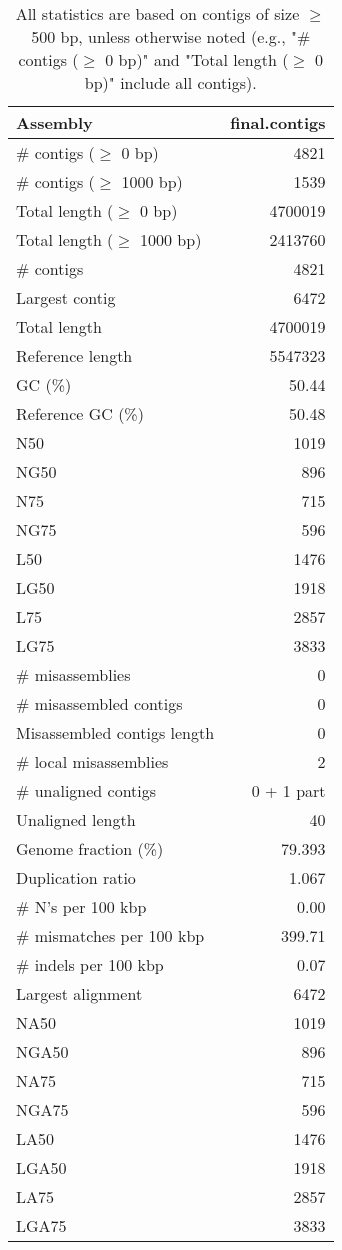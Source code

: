 \documentclass[12pt,a4paper]{article}
\begin{document}
\begin{table}[ht]
\begin{center}
\caption{All statistics are based on contigs of size $\geq$ 500 bp, unless otherwise noted (e.g., "\# contigs ($\geq$ 0 bp)" and "Total length ($\geq$ 0 bp)" include all contigs).}
\begin{tabular}{|l*{1}{|r}|}
\hline
Assembly & final.contigs \\ \hline
\# contigs ($\geq$ 0 bp) & 4821 \\ \hline
\# contigs ($\geq$ 1000 bp) & 1539 \\ \hline
Total length ($\geq$ 0 bp) & 4700019 \\ \hline
Total length ($\geq$ 1000 bp) & 2413760 \\ \hline
\# contigs & 4821 \\ \hline
Largest contig & 6472 \\ \hline
Total length & 4700019 \\ \hline
Reference length & 5547323 \\ \hline
GC (\%) & 50.44 \\ \hline
Reference GC (\%) & 50.48 \\ \hline
N50 & 1019 \\ \hline
NG50 & 896 \\ \hline
N75 & 715 \\ \hline
NG75 & 596 \\ \hline
L50 & 1476 \\ \hline
LG50 & 1918 \\ \hline
L75 & 2857 \\ \hline
LG75 & 3833 \\ \hline
\# misassemblies & 0 \\ \hline
\# misassembled contigs & 0 \\ \hline
Misassembled contigs length & 0 \\ \hline
\# local misassemblies & 2 \\ \hline
\# unaligned contigs & 0 + 1 part \\ \hline
Unaligned length & 40 \\ \hline
Genome fraction (\%) & 79.393 \\ \hline
Duplication ratio & 1.067 \\ \hline
\# N's per 100 kbp & 0.00 \\ \hline
\# mismatches per 100 kbp & 399.71 \\ \hline
\# indels per 100 kbp & 0.07 \\ \hline
Largest alignment & 6472 \\ \hline
NA50 & 1019 \\ \hline
NGA50 & 896 \\ \hline
NA75 & 715 \\ \hline
NGA75 & 596 \\ \hline
LA50 & 1476 \\ \hline
LGA50 & 1918 \\ \hline
LA75 & 2857 \\ \hline
LGA75 & 3833 \\ \hline
\end{tabular}
\end{center}
\end{table}
\end{document}
